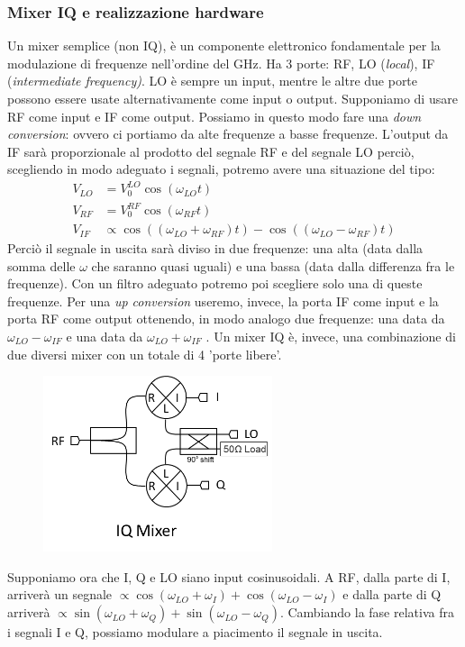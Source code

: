 \subsubsection{Mixer IQ e realizzazione hardware}
Un mixer semplice (non IQ), è un componente elettronico fondamentale per la modulazione di frequenze nell'ordine del GHz. Ha 3 porte: RF, LO (\textit{local}), IF (\textit{intermediate frequency)}. LO è sempre un input, mentre le altre due porte possono essere usate alternativamente come input o output.
Supponiamo di usare RF come input e IF come output. Possiamo in questo modo fare una \textit{down conversion}: ovvero ci portiamo da alte frequenze a basse frequenze. L'output da IF sarà proporzionale al prodotto del segnale RF e del segnale LO perciò, scegliendo in modo adeguato i segnali, potremo avere una situazione del tipo:
\begin{align*}
    V_{LO} &= V_0^{LO} \cos (\omega_{LO} t) \\
    V_{RF} &= V_0^{RF} \cos (\omega_{RF} t ) \\
    V_{IF} &\propto \cos ((\omega_{LO} + \omega_{RF}) t)- \cos ((\omega_{LO} - \omega_{RF}) t)
\end{align*}
Perciò il segnale in uscita sarà diviso in due frequenze: una alta (data dalla somma delle $\omega$ che saranno quasi uguali) e una bassa (data dalla differenza fra le frequenze). Con un filtro adeguato potremo poi scegliere solo una di queste frequenze.
Per una \textit{up conversion} useremo, invece, la porta IF come input e la porta RF come output ottenendo, in modo analogo due frequenze: una data da $\omega_{LO} - \omega_{IF}$ e una data da $\omega_{LO} + \omega_{IF}$ .
Un mixer IQ è, invece, una combinazione di due diversi mixer con un totale di 4 'porte libere'. 
\begin{figure}[H]
    \centering
    \includegraphics[width=0.6\textwidth]{images/iq_mixer.png}
\end{figure}
\noindent Supponiamo ora che I, Q e LO siano input cosinusoidali. 
A RF, dalla parte di I, arriverà un segnale $\propto \cos(\omega_{LO} + \omega_I)+ \cos (\omega_{LO} - \omega_I) $ e dalla parte di Q arriverà $\propto  \sin(\omega_{LO} + \omega_Q)+ \sin (\omega_{LO} - \omega_Q)$.
Cambiando la fase relativa fra i segnali I e Q, possiamo modulare a piacimento il segnale in uscita.

